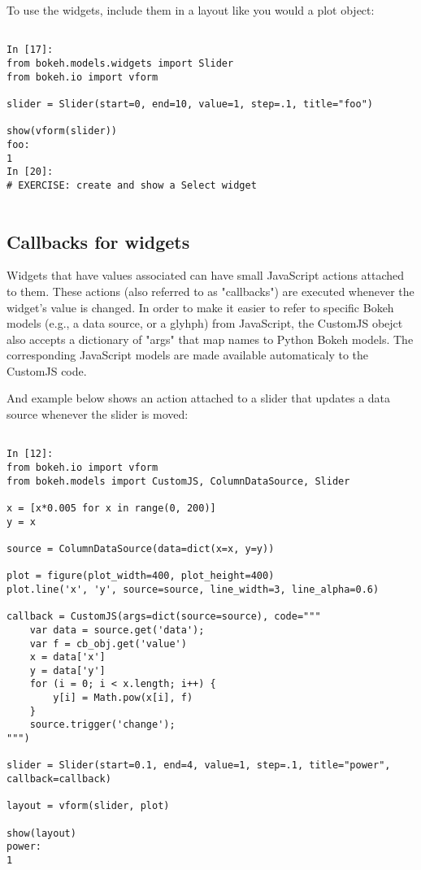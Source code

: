 \documentclass[a4paper,12pt]{article}
\begin{document}
To use the widgets, include them in a layout like you would a plot object:
\begin{framed}
	\begin{verbatim}
	
In [17]:
from bokeh.models.widgets import Slider
from bokeh.io import vform

slider = Slider(start=0, end=10, value=1, step=.1, title="foo")

show(vform(slider))
foo:  
1
In [20]:
# EXERCISE: create and show a Select widget 
	
\end{verbatim}
\end{framed}

\subsection{Callbacks for widgets}
Widgets that have values associated can have small JavaScript actions attached to them. These actions (also referred to as "callbacks") are executed whenever the widget's value is changed. In order to make it easier to refer to specific Bokeh models (e.g., a data source, or a glyhph) from JavaScript, the CustomJS obejct also accepts a dictionary of "args" that map names to Python Bokeh models. The corresponding JavaScript models are made available automaticaly to the CustomJS code.

And example below shows an action attached to a slider that updates a data source whenever the slider is moved:
\begin{framed}
	\begin{verbatim}
	
In [12]:
from bokeh.io import vform
from bokeh.models import CustomJS, ColumnDataSource, Slider

x = [x*0.005 for x in range(0, 200)]
y = x

source = ColumnDataSource(data=dict(x=x, y=y))

plot = figure(plot_width=400, plot_height=400)
plot.line('x', 'y', source=source, line_width=3, line_alpha=0.6)

callback = CustomJS(args=dict(source=source), code="""
    var data = source.get('data');
    var f = cb_obj.get('value')
    x = data['x']
    y = data['y']
    for (i = 0; i < x.length; i++) {
        y[i] = Math.pow(x[i], f)
    }
    source.trigger('change');
""")

slider = Slider(start=0.1, end=4, value=1, step=.1, title="power", callback=callback)

layout = vform(slider, plot)

show(layout)
power:  
1
	
\end{verbatim}
\end{framed}
 	
\end{document}
